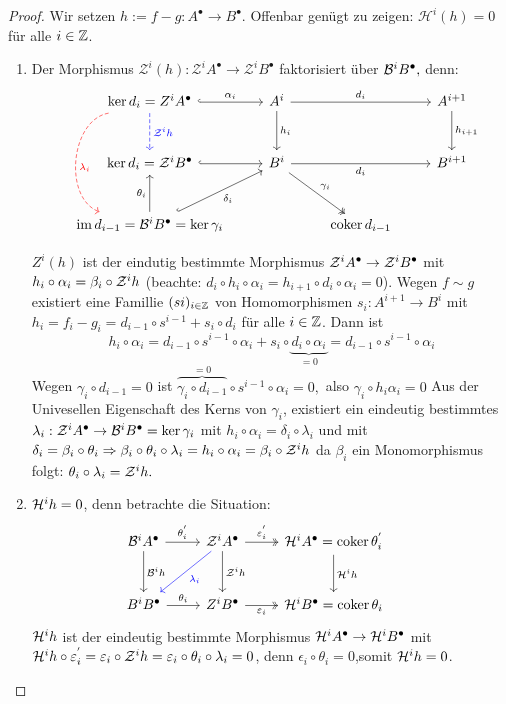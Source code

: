 \begin{proof}
	Wir setzen $h:= f-g: A^{\bullet} \to B^{\bullet} $. Offenbar genügt zu zeigen: $\mathcal{H}^i(h) = 0 $ für alle $ i \in \mathbb{Z}$. 
	\begin{enumerate}
		\item Der Morphismus $ \mathcal{Z}^i(h): \mathcal{Z}^iA^{\bullet} \to \mathcal{Z}^iB^{\bullet} $ faktorisiert über $\mathcal{B}^iB^{\bullet},$ denn: \\
		$$\begin{tikzcd}[row sep = large]
		\ker d_i = Z^iA^{\bullet} \arrow[dashed, blue]{d}{\ZZ^ih} \arrow[hook]{r}{\alpha_i} \arrow[dashed,red, bend right = 75]{dd}{\lambda_i}& A^i \arrow{d}{h_i}\arrow{rr}{d_i} & & A^{i+1} \arrow{d}{h_{i+1}} \\
		\ker d_i =\ZZ^iB^{\bullet} \arrow[hook]{r} & B^i \arrow[swap]{rr}{d_i}\arrow[two heads]{dr}{\gamma_i} & & B^{i+1}  \\
		\im d_{i-1} = \BB^iB^{\bullet} = \ker \gamma_i \arrow{u}{\theta_i} \arrow[swap, hook]{ur}{\delta_i} &  &\coker d_{i-1} &
		\end{tikzcd}$$
		
		$Z^i(h) $ ist der eindutig bestimmte Morphismus $ \mathcal{Z}^iA^{\bullet} \to \mathcal{Z}^iB^{\bullet} $ mit $h_i \circ \alpha_i = \beta_i \circ \mathcal{Z}^ih $ (beachte: $d_i \circ h_i \circ \alpha_i = h_{i+1} \circ d_i \circ \alpha_i = 0$). Wegen $ f \sim g $ existiert eine Famillie $(si)_{i \in \mathbb{Z}} $ von Homomorphismen $s_i: A^{i+1} \to B^i $ mit $ h_i=f_i -g_i = d_{i -1} \circ s^{i-1} + s_i \circ d_i $ für alle $i \in \mathbb{Z}$. Dann ist
		$$h_i \circ \alpha_i = d_{i-1} \circ s^{i-1} \circ \alpha_i + s_i \circ \underbrace{d_i \circ \alpha_i}_{=0} = d_{i-1} \circ s^{i-1} \circ \alpha_i$$ Wegen $ \gamma_i \circ d_{i-1}= 0 $ ist $ \overbrace{\gamma_i \circ d_{i-1}}^{=0} \circ s^{i-1} \circ \alpha_i = 0, $ also $ \gamma_i \circ h_i \alpha_i = 0$ Aus der Univesellen Eigenschaft des Kerns von $\gamma_i $, existiert ein eindeutig bestimmtes $ \lambda_i : \mathcal{Z}^iA^{\bullet} \to \mathcal{B}^iB^{\bullet} = \ker \gamma_i $ mit $ h_i \circ \alpha_i = \delta_i \circ \lambda_i $ und mit $\delta_i = \beta_i \circ \theta_i \Rightarrow \beta_i \circ \theta_i \circ \lambda_i = h_i \circ \alpha_i = \beta_i \circ \mathcal{Z}^ih $ da $\beta_i$ ein Monomorphismus folgt: $ \theta_i \circ \lambda_i = \mathcal{Z}^ih.$
		\item $\mathcal{H}^ih = 0$, denn betrachte die Situation:
		$$\begin{tikzcd}[row sep = large]
		\BB^iA^{\bullet} \arrow{d}{\BB^ih} \arrow{r}{\theta_i^{'}} & \ZZ^iA^{\bullet} \arrow{d}{\ZZ^ih} \arrow[blue]{dl}{\lambda_i} \arrow[two heads]{r}{\epsilon_i^{'}} & \HH^iA^{\bullet} = \coker \theta_i^{'} \arrow{d}{\HH^ih} & \\
		B^iB^{\bullet} \arrow{r}{\theta_i} & Z^iB^{\bullet} \arrow[swap, two heads]{r}{\epsilon_i} & \HH^iB^{\bullet} = \coker \theta_i& 
		\end{tikzcd}$$
		$\mathcal{H}^ih$ ist der eindeutig bestimmte Morphismus $\mathcal{H}^iA^{\bullet} \to \mathcal{H}^iB^{\bullet} $ mit $\mathcal{H}^ih \circ \varepsilon_i^{'} = \varepsilon_i \circ \mathcal{Z}^ih = \varepsilon_i \circ \theta_i \circ \lambda_i = 0$, denn $\epsilon_i \circ \theta_i =0 $,somit $\mathcal{H}^ih=0 $.
	\end{enumerate}
\end{proof}
